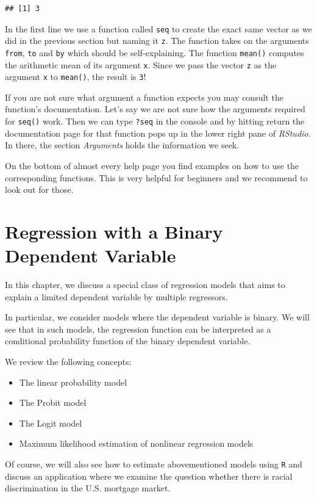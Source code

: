 \documentclass[]{book}
\providecommand{\tightlist}{%
  \setlength{\itemsep}{0pt}\setlength{\parskip}{0pt}}
\theoremstyle{definition}
\theoremstyle{definition}
\theoremstyle{definition}
\theoremstyle{remark}
\begin{document}
\begin{verbatim}
## [1] 3
\end{verbatim}

In the first line we use a function called \texttt{seq} to create the
exact same vector as we did in the previous section but naming it
\texttt{z}. The function takes on the arguments \texttt{from},
\texttt{to} and \texttt{by} which should be self-explaining. The
function \texttt{mean()} computes the arithmetic mean of its argument
\texttt{x}. Since we pass the vector \texttt{z} as the argument
\texttt{x} to \texttt{mean()}, the result is \texttt{3}!

If you are not sure what argument a function expects you may consult the
function's documentation. Let's say we are not sure how the arguments
required for \texttt{seq()} work. Then we can type \texttt{?seq} in the
console and by hitting return the documentation page for that function
pops up in the lower right pane of \emph{RStudio}. In there, the section
\emph{Arguments} holds the information we seek.

On the bottom of almost every help page you find examples on how to use
the corresponding functions. This is very helpful for beginners and we
recommend to look out for those.

\chapter{Regression with a Binary Dependent Variable}\label{rwabdv}

In this chapter, we discuss a special class of regression models that
aims to explain a limited dependent variable by multiple regressors.

In particular, we consider models where the dependent variable is
binary. We will see that in such models, the regression function can be
interpreted as a conditional probability function of the binary
dependent variable.

We review the following concepts:

\begin{itemize}
\tightlist
\item
  The linear probability model
\item
  The Probit model
\item
  The Logit model
\item
  Maximum likelihood estimation of nonlinear regression models
\end{itemize}

Of course, we will also see how to estimate abovementioned models using
\texttt{R} and discuss an application where we examine the question
whether there is racial discrimination in the U.S. mortgage market.
\end{document}
